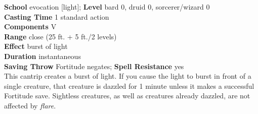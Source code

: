 \textbf{School} evocation [light]; \textbf{Level} bard 0, druid 0, sorcerer/wizard 0\\
\textbf{Casting Time} 1 standard action\\
\textbf{Components} V\\
\textbf{Range} close (25 ft. + 5 ft./2 levels)\\
\textbf{Effect} burst of light\\
\textbf{Duration} instantaneous\\
\textbf{Saving Throw} Fortitude negates; \textbf{Spell Resistance} yes\\
This cantrip creates a burst of light. If you cause the light to burst in front of a single creature, that creature is dazzled for 1 minute unless it makes a successful Fortitude save. Sightless creatures, as well as creatures already dazzled, are not affected by \textit{flare}.\\
